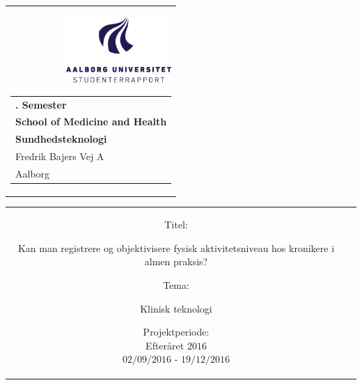 % 
\thispagestyle{empty}
\begin{nopagebreak}
{\samepage 

\begin{tabular}{r}
\parbox{\textwidth}{ 
 {\includegraphics[height=2.5cm]{figures/aaulogo-da.png}}
\hfill \hspace{2cm} \parbox{8cm}
{\begin{tabular}{l} %
{\small \textbf{$5$. Semester}}\\
{\small \textbf{School of Medicine and Health}}\\
{\small \textbf{Sundhedsteknologi}}\\
{\small Fredrik Bajers Vej $7$A} \\
{\small $9220$ Aalborg} \\
\end{tabular}}}
\end{tabular}

\hspace{-1.5cm}\begin{tabular}{cc}
\parbox{7cm}{
\begin{description}

\item {Titel:}

Kan man registrere og objektivisere fysisk aktivitetsniveau hos kronikere i almen praksis?\\

\item {Tema:} 

\small{
Klinisk teknologi
}

\end{description}

\parbox{8cm}{

\begin{description}
\item {Projektperiode:}\\
   Efteråret $2016$\\
   $02/09/2016$ - $19/12/2016$\\
   

\end{description}}}
\end{tabular}}
\end{nopagebreak}
